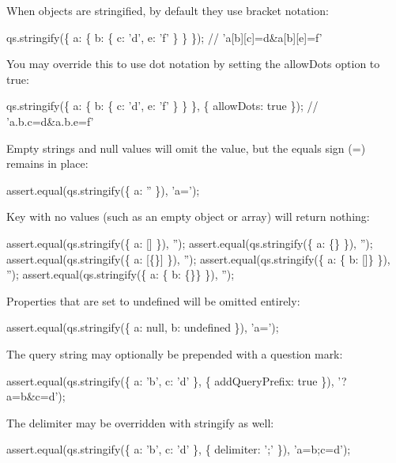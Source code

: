 When objects are stringified, by default they use bracket notation\+:


\begin{DoxyCode}
qs.stringify(\{ a: \{ b: \{ c: 'd', e: 'f' \} \} \});
// 'a[b][c]=d&a[b][e]=f'
\end{DoxyCode}


You may override this to use dot notation by setting the {\ttfamily allow\+Dots} option to {\ttfamily true}\+:


\begin{DoxyCode}
qs.stringify(\{ a: \{ b: \{ c: 'd', e: 'f' \} \} \}, \{ allowDots: true \});
// 'a.b.c=d&a.b.e=f'
\end{DoxyCode}


Empty strings and null values will omit the value, but the equals sign (=) remains in place\+:


\begin{DoxyCode}
assert.equal(qs.stringify(\{ a: '' \}), 'a=');
\end{DoxyCode}


Key with no values (such as an empty object or array) will return nothing\+:


\begin{DoxyCode}
assert.equal(qs.stringify(\{ a: [] \}), '');
assert.equal(qs.stringify(\{ a: \{\} \}), '');
assert.equal(qs.stringify(\{ a: [\{\}] \}), '');
assert.equal(qs.stringify(\{ a: \{ b: []\} \}), '');
assert.equal(qs.stringify(\{ a: \{ b: \{\}\} \}), '');
\end{DoxyCode}


Properties that are set to {\ttfamily undefined} will be omitted entirely\+:


\begin{DoxyCode}
assert.equal(qs.stringify(\{ a: null, b: undefined \}), 'a=');
\end{DoxyCode}


The query string may optionally be prepended with a question mark\+:


\begin{DoxyCode}
assert.equal(qs.stringify(\{ a: 'b', c: 'd' \}, \{ addQueryPrefix: true \}), '?a=b&c=d');
\end{DoxyCode}


The delimiter may be overridden with stringify as well\+:


\begin{DoxyCode}
assert.equal(qs.stringify(\{ a: 'b', c: 'd' \}, \{ delimiter: ';' \}), 'a=b;c=d');
\end{DoxyCode}


